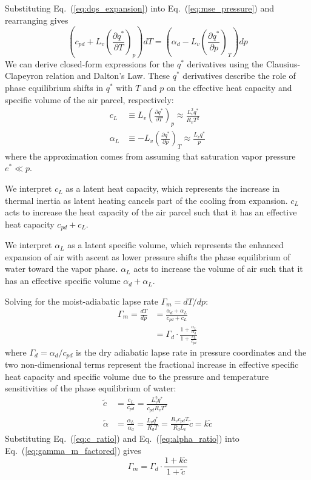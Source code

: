\documentclass[]{ametsocV6.1}
\begin{document}
Substituting Eq.~(\ref{eq:dqs_expansion}) into Eq.~(\ref{eq:mse_pressure}) and rearranging gives
\begin{equation}
\left(c_{pd} + L_v\left(\frac{\partial q^*}{\partial T}\right)_p \right)dT = \left(\alpha_d - L_v\left(\frac{\partial q^*}{\partial p}\right)_T\right)dp \label{eq:rearranged}
\end{equation}
We can derive closed-form expressions for the $q^*$ derivatives using the Clausius-Clapeyron relation and Dalton's Law. These $q^*$ derivatives describe the role of phase equilibrium shifts in $q^*$ with $T$ and $p$ on the effective heat capacity and specific volume of the air parcel, respectively:
\begin{align}
c_L &\equiv L_v\left(\frac{\partial q^*}{\partial T}\right)_p \approx \frac{L_v^2 q^*}{R_v T^2}
\label{eq:c_L} \\
\alpha_L &\equiv -L_v\left(\frac{\partial q^*}{\partial p}\right)_T \approx \frac{L_v q^*}{p}
\label{eq:alpha_L}
\end{align}
where the approximation comes from assuming that saturation vapor pressure $e^* \ll p$.

We interpret $c_L$ as a latent heat capacity, which represents the increase in thermal inertia as latent heating cancels part of the cooling from expansion. $c_L$ acts to increase the heat capacity of the air parcel such that it has an effective heat capacity $c_{pd} + c_L$.

We interpret $\alpha_L$ as a latent specific volume, which represents the enhanced expansion of air with ascent as lower pressure shifts the phase equilibrium of water toward the vapor phase. $\alpha_L$ acts to increase the volume of air such that it has an effective specific volume $\alpha_d + \alpha_L$.

Solving for the moist-adiabatic lapse rate $\Gamma_m = dT/dp$:
\begin{align}
\Gamma_m = \frac{dT}{dp} &= \frac{\alpha_d +\alpha_L}{c_{pd} + c_L} \label{eq:gamma_m_ratio} \\
&= \Gamma_d \cdot \frac{1+\frac{\alpha_L}{\alpha_d}}{1+\frac{c_L}{c_{pd}}} \label{eq:gamma_m_factored}
\end{align}
where $\Gamma_d = \alpha_d / c_{pd}$ is the dry adiabatic lapse rate in pressure coordinates and the two non-dimensional terms represent the fractional increase in effective specific heat capacity and specific volume due to the pressure and temperature sensitivities of the phase equilibrium of water:
\begin{align}
\tilde{c} &= \frac{c_L}{c_{pd}} = \frac{L_v^2 q^*}{c_{pd} R_v T^2} \label{eq:c_ratio} \\
\tilde{\alpha} &= \frac{\alpha_L}{\alpha_d} = \frac{L_v q^*}{R_d T} = \frac{R_v c_{pd}T}{R_dL_v}\tilde{c} = k\tilde{c} \label{eq:alpha_ratio}
\end{align}
Substituting Eq.~(\ref{eq:c_ratio}) and Eq.~(\ref{eq:alpha_ratio}) into Eq.~(\ref{eq:gamma_m_factored}) gives
\begin{equation}
\Gamma_m = \Gamma_d \cdot \frac{1 + k\tilde{c}}{1 + \tilde{c}} \label{eq:gamma_m_tilde}
\end{equation}
\end{document}
